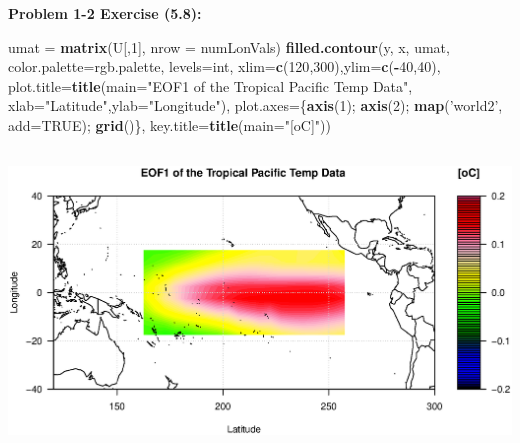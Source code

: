 \documentclass[11pt]{article}
\newenvironment{problem}[1]{\textbf{Problem #1:}}{\newpage}
\newenvironment{Shaded}{\begin{snugshade}}{\end{snugshade}}
\newcommand{\DataTypeTok}[1]{\textcolor[rgb]{0.13,0.29,0.53}{#1}}
\newcommand{\DecValTok}[1]{\textcolor[rgb]{0.00,0.00,0.81}{#1}}
\newcommand{\KeywordTok}[1]{\textcolor[rgb]{0.13,0.29,0.53}{\textbf{#1}}}
\newcommand{\NormalTok}[1]{#1}
\newcommand{\OperatorTok}[1]{\textcolor[rgb]{0.81,0.36,0.00}{\textbf{#1}}}
\newcommand{\OtherTok}[1]{\textcolor[rgb]{0.56,0.35,0.01}{#1}}
\newcommand{\StringTok}[1]{\textcolor[rgb]{0.31,0.60,0.02}{#1}}
\begin{document}
\begin{problem}{1-2 Exercise (5.8)}
\begin{enumerate}[label = (\alph*)]
\begin{Shaded}
\begin{Highlighting}
\NormalTok{umat =}\StringTok{ }\KeywordTok{matrix}\NormalTok{(U[,}\DecValTok{1}\NormalTok{], }\DataTypeTok{nrow =}\NormalTok{ numLonVals)}
\KeywordTok{filled.contour}\NormalTok{(y, x, umat, }\DataTypeTok{color.palette=}\NormalTok{rgb.palette, }\DataTypeTok{levels=}\NormalTok{int,}
               \DataTypeTok{xlim=}\KeywordTok{c}\NormalTok{(}\DecValTok{120}\NormalTok{,}\DecValTok{300}\NormalTok{),}\DataTypeTok{ylim=}\KeywordTok{c}\NormalTok{(}\OperatorTok{-}\DecValTok{40}\NormalTok{,}\DecValTok{40}\NormalTok{),}
               \DataTypeTok{plot.title=}\KeywordTok{title}\NormalTok{(}\DataTypeTok{main=}\StringTok{"EOF1 of the Tropical Pacific Temp Data"}\NormalTok{,}
                                \DataTypeTok{xlab=}\StringTok{"Latitude"}\NormalTok{,}\DataTypeTok{ylab=}\StringTok{"Longitude"}\NormalTok{),}
               \DataTypeTok{plot.axes=}\NormalTok{\{}\KeywordTok{axis}\NormalTok{(}\DecValTok{1}\NormalTok{); }\KeywordTok{axis}\NormalTok{(}\DecValTok{2}\NormalTok{); }\KeywordTok{map}\NormalTok{(}\StringTok{'world2'}\NormalTok{, }\DataTypeTok{add=}\OtherTok{TRUE}\NormalTok{); }\KeywordTok{grid}\NormalTok{()\},}
               \DataTypeTok{key.title=}\KeywordTok{title}\NormalTok{(}\DataTypeTok{main=}\StringTok{"[oC]"}\NormalTok{))}
\end{Highlighting}
\end{Shaded}

\includegraphics[height = 8cm]{Figures/Prob1/EOF1}


\end{enumerate}
\end{problem}
\end{document}
